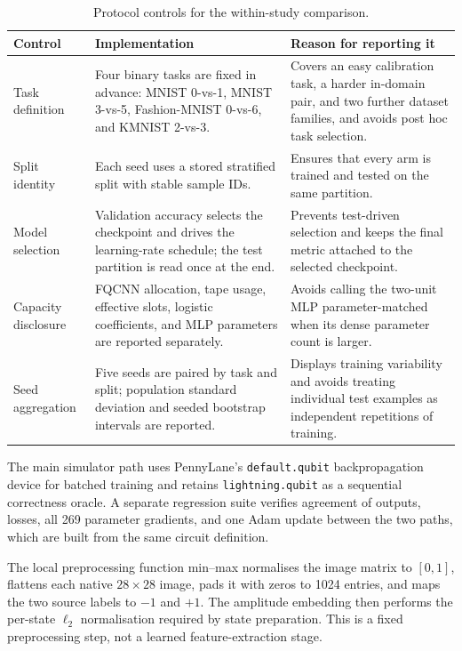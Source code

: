 \documentclass[conference]{IEEEtran}
\begin{document}
\begin{table}[!t]
\caption{Protocol controls for the within-study comparison.}
\label{tab:protocol-controls}
\centering
\small
\begin{tabular}{@{}p{}p{}p{}@{}}
\toprule
\textbf{Control} & \textbf{Implementation} & \textbf{Reason for reporting it} \\
\midrule
Task definition & Four binary tasks are fixed in advance: MNIST 0-vs-1, MNIST 3-vs-5, Fashion-MNIST 0-vs-6, and KMNIST 2-vs-3. & Covers an easy calibration task, a harder in-domain pair, and two further dataset families, and avoids post hoc task selection. \\
Split identity & Each seed uses a stored stratified split with stable sample IDs. & Ensures that every arm is trained and tested on the same partition. \\
Model selection & Validation accuracy selects the checkpoint and drives the learning-rate schedule; the test partition is read once at the end. & Prevents test-driven selection and keeps the final metric attached to the selected checkpoint. \\
Capacity disclosure & FQCNN allocation, tape usage, effective slots, logistic coefficients, and MLP parameters are reported separately. & Avoids calling the two-unit MLP parameter-matched when its dense parameter count is larger. \\
Seed aggregation & Five seeds are paired by task and split; population standard deviation and seeded bootstrap intervals are reported. & Displays training variability and avoids treating individual test examples as independent repetitions of training. \\
\bottomrule
\end{tabular}
\end{table}

The main simulator path uses PennyLane's \texttt{default.qubit} backpropagation
device for batched training and retains \texttt{lightning.qubit} as a sequential
correctness oracle. A separate regression suite verifies agreement of outputs,
losses, all 269 parameter gradients, and one Adam update between the two paths,
which are built from the same circuit definition.

The local preprocessing function min--max normalises the image matrix to
$[0,1]$, flattens each native $28\times28$ image, pads it with zeros to 1024
entries, and maps the two source labels to $-1$ and $+1$. The amplitude embedding
then performs the per-state $\ell_2$ normalisation required by state preparation.
 This is a fixed preprocessing step, not a learned feature-extraction stage.
\end{document}
